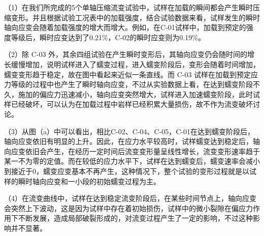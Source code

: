 （1）在我们所完成的5个单轴压缩流变试验中，试样在加载的瞬间都会产生瞬时压缩变形。并且根据试验工况表中的加载强度，结合试验数据来看，试样发生的瞬时轴向应变会随着加载强度的增大而增大。例如，在C-01试样中，加载到预定的强度等级后，瞬时应变达到了0.21\%，C-02的瞬时应变则为0.19\%。

（2）除 C-03 外，其余四组试验在产生瞬时变形后，其轴向应变仍会随时间的增长缓慢增加，说明试样进入了蠕变过程，进入蠕变阶段后，变形会随着时间增加，蠕变变形趋于稳定，故在图中看起来近似一条直线。而 C-03 试样在加载到预定应力等级的过程中也产生了瞬时轴向应变，不过从实验数据上看，在达到蠕变阶段不久，施加的偏应力迅速减小，轴向应变突然增大，试样进入加速蠕变阶段，此时试样已经破坏，可以认为在加载过程中岩样已经积累大量损伤，故不作为流变破坏讨论。

（3）从图（a）中可以看出，相比C-02、C-04、C-05，C-01在达到蠕变阶段后，轴向应变依旧有明显的上升。因此，在应力水平较高时，试样蠕变达到稳定后，轴向应变依旧会产生，在经历一定时间后流变变形量呈线性增长，流变变形速率趋于某一不为零的定值。而在较低的应力水平下，试样在达到蠕变后，蠕变速率会减小到接近于0，蠕变应变基本不再产生，这种情况下，整个试验的变形过程就是以试样的瞬时轴向应变和一小段的初始蠕变过程为主。

（4）在流变曲线中，试样在达到稳定流变阶段后，在某些时间节点上，轴向应变会突然上下波动，这是因为试样中存在着初始损伤，试样中的微小裂隙在偏应力作用下不断发展，造成局部破裂形成的，对流变过程产生了一定的影响，不过这种影响并不显著。

